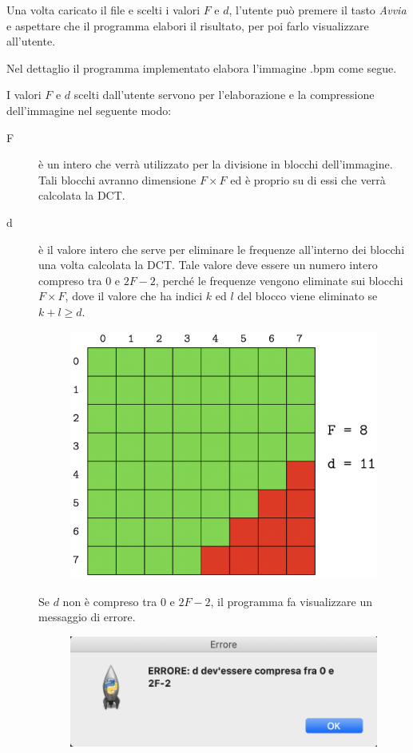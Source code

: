 \documentclass[preprint,12pt]{elsarticle}
\begin{document}
Una volta caricato il file e scelti i valori $F$ e $d$, l'utente può premere il tasto \textit{Avvia} e aspettare che il programma elabori il risultato, per poi farlo visualizzare all'utente.

Nel dettaglio il programma implementato elabora l'immagine .bpm come segue.

I valori $F$ e $d$ scelti dall'utente servono per l'elaborazione e la compressione dell'immagine nel seguente modo:
\begin{description}
\item[F] è un intero che verrà utilizzato per la divisione in blocchi dell'immagine. Tali blocchi avranno dimensione $F \times F$ ed è proprio su di essi che verrà calcolata la DCT.
\item[d] è il valore intero che serve per eliminare le frequenze all'interno dei blocchi una volta calcolata la DCT. Tale valore deve essere un numero intero compreso tra $0$ e $2F-2$, perché le frequenze vengono eliminate sui blocchi $F \times F$, dove il valore che ha indici $k$ ed $l$ del blocco viene eliminato se $k + l \geq d$. 
\begin{figure}[H]
	\centering
	\includegraphics[width=0.5\linewidth]{esempio}
\end{figure}
Se $d$ non è compreso tra $0$ e $2F-2$, il programma fa visualizzare un messaggio di errore.
\begin{figure}[H]
	\centering
	\includegraphics[width=0.55\linewidth]{errore}
\end{figure}
\end{description}
\end{document}
